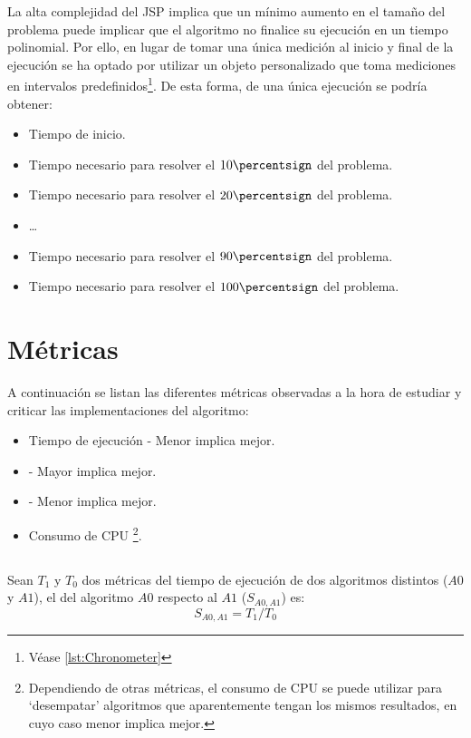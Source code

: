La alta complejidad del JSP implica que un mínimo aumento en el tamaño del problema
puede implicar que el algoritmo no finalice su ejecución en un tiempo polinomial.
Por ello, en lugar de tomar una única medición al inicio y final de la ejecución
se ha optado por utilizar un objeto personalizado que toma mediciones en intervalos
predefinidos\footnote{Véase \ref{lst:Chronometer}}.
De esta forma, de una única ejecución se podría obtener:

\begin{itemize}[itemsep=0.25px]
    \item Tiempo de inicio.
    \item Tiempo necesario para resolver el $10\percentsign$ del problema.
    \item Tiempo necesario para resolver el $20\percentsign$ del problema.
    \item \dots
    \item Tiempo necesario para resolver el $90\percentsign$ del problema.
    \item Tiempo necesario para resolver el $100\percentsign$ del problema.
\end{itemize}

\section{Métricas}

A continuación se listan las diferentes métricas observadas a la hora
de estudiar y criticar las implementaciones del algoritmo:
\begin{itemize}[itemsep=0.25px]
    \item Tiempo de ejecución - Menor implica mejor.
    \item {} - Mayor implica mejor.
    \item {} - Menor implica mejor.
    \item Consumo de CPU \footnote{
        Dependiendo de otras métricas, el consumo de CPU se
        puede utilizar para `desempatar' algoritmos que
        aparentemente tengan los mismos resultados,
        en cuyo caso menor implica mejor.
    }.
\end{itemize}

\subsection{}

Sean $T_1$ y $T_0$ dos métricas del tiempo de ejecución
de dos algoritmos distintos ($A0$ y $A1$),
el  del algoritmo $A0$ respecto al $A1$ ($S_{A0,A1}$) es:
$$
    S_{A0,A1} = T_1 / T_0
$$

